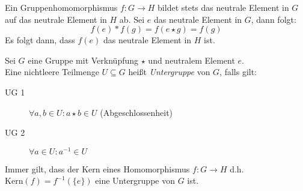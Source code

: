 \lemma{}
Ein Gruppenhomomorphismus $f:G\rightarrow H$ bildet stets das neutrale Element in $G$ auf das neutrale Element in $H$ ab.
\beweis
Sei $e$ das neutrale Element in $G$, dann folgt:
\begin{equation*}
  f(e)\ast f(g)=f(e\star g)=f(g)
\end{equation*}
Es folgt dann, dass $f(e)$ das neutrale Element in $H$ ist.


Sei $G$ eine Gruppe mit Verknüpfung $\star$ und neutralem Element $e$.\\
Eine nichtleere Teilmenge $U\subseteq G$ heißt \emph{Untergruppe} von $G$, falls gilt:
\begin{description}
  \item[UG 1] $\forall a,b\in U : a\star b\in U$ (Abgeschlossenheit)
  \item[UG 2] $\forall a\in U : a^{-1}\in U$
\end{description}

Immer gilt, dass der Kern eines Homomorphismus $f:G \rightarrow H$ d.h. $\mathrm{Kern}(f)=f^{-1}(\{e\})$  eine Untergruppe von $G$ ist.
